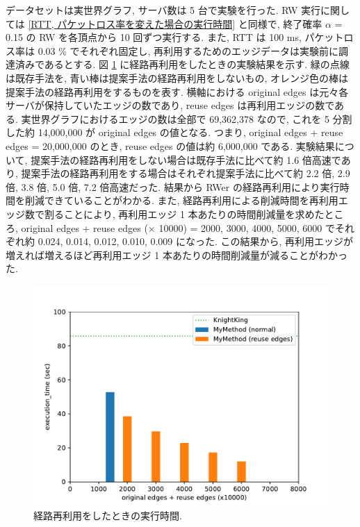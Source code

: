 データセットは実世界グラフ, サーバ数は 5 台で実験を行った. RW 実行に関しては \ref{RTT, パケットロス率を変えた場合の実行時間} と同様で, 終了確率 $\alpha$ = 0.15 の RW を各頂点から 10 回ずつ実行する. また, RTT は 100 ms, パケットロス率は 0.03 \% でそれぞれ固定し, 再利用するためのエッジデータは実験前に調達済みであるとする. 図 \ref{経路再利用をしたときの実行時間} に経路再利用をしたときの実験結果を示す. 緑の点線は既存手法を, 青い棒は提案手法の経路再利用をしないもの, オレンジ色の棒は提案手法の経路再利用をするものを表す. 横軸における original edges は元々各サーバが保持していたエッジの数であり, reuse edges は再利用エッジの数である. 実世界グラフにおけるエッジの数は全部で 69,362,378 なので, これを 5 分割した約 14,000,000 が original edges の値となる. つまり, original edges + reuse edges = 20,000,000 のとき, reuse edges の値は約 6,000,000 である. 実験結果について, 提案手法の経路再利用をしない場合は既存手法に比べて約 1.6 倍高速であり, 提案手法の経路再利用をする場合はそれぞれ提案手法に比べて約 2.2 倍, 2.9 倍, 3.8 倍, 5.0 倍, 7.2 倍高速だった. 結果から RWer の経路再利用により実行時間を削減できていることがわかる. また, 経路再利用による削減時間を再利用エッジ数で割ることにより, 再利用エッジ 1 本あたりの時間削減量を求めたところ, original edges + reuse edges ($\times$ 10000) = 2000, 3000, 4000, 5000, 6000 でそれぞれ約 0.024, 0.014, 0.012, 0.010, 0.009 になった. この結果から, 再利用エッジが増えれば増えるほど再利用エッジ 1 本あたりの時間削減量が減ることがわかった. 

\begin{figure}[t]
    \centering
    \includegraphics[scale=0.8]{figure/AR_cache.pdf}
    \caption{経路再利用をしたときの実行時間.}
    \label{経路再利用をしたときの実行時間}
\end{figure}

